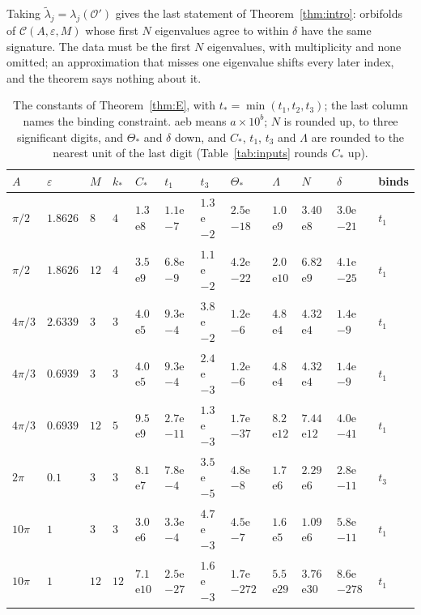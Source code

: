\documentclass[pdflatex,sn-mathphys-num]{sn-jnl}
\theoremstyle{thmstyleone}%
\theoremstyle{thmstylethree}%
\newcommand{\Orb}{\mathcal{O}}
\newcommand{\Cl}{\mathcal{C}}
\begin{document}
Taking $\tilde\lambda_j=\lambda_j(\Orb')$ gives the last statement of Theorem~\ref{thm:intro}: orbifolds of $\Cl(A,\varepsilon,M)$ whose first $N$ eigenvalues agree to within $\delta$ have the same signature. The data must be the first $N$ eigenvalues, with multiplicity and none omitted; an approximation that misses one eigenvalue shifts every later index, and the theorem says nothing about it.

\begin{table}[t]
\centering\footnotesize
\caption{The constants of Theorem~\ref{thm:E}, with $t_*=\min(t_1,t_2,t_3)$; the last column names the binding constraint. aeb means $a\times10^b$; $N$ is rounded up, to three significant digits, and $\Theta_*$ and $\delta$ down, and $C_*$, $t_1$, $t_3$ and $\Lambda$ are rounded to the nearest unit of the last digit (Table~\ref{tab:inputs} rounds $C_*$ up).}\label{tab:E}
\setlength{\tabcolsep}{3pt}\begin{tabular}{@{}llllllllllll@{}}
\toprule
$A$ & $\varepsilon$ & $M$ & $k_*$ & $C_*$ & $t_1$ & $t_3$ & $\Theta_*$ & $\Lambda$ & $N$ & $\delta$ & binds\\
\midrule
$\pi/2$ & $1.8626$ & $8$ & $4$ & $1.3$e$8$ & $1.1$e$-7$ & $1.3$e$-2$ & $2.5$e$-18$ & $1.0$e$9$ & $3.40$e$8$ & $3.0$e$-21$ & $t_1$\\
$\pi/2$ & $1.8626$ & $12$ & $4$ & $3.5$e$9$ & $6.8$e$-9$ & $1.1$e$-2$ & $4.2$e$-22$ & $2.0$e$10$ & $6.82$e$9$ & $4.1$e$-25$ & $t_1$\\
$4\pi/3$ & $2.6339$ & $3$ & $3$ & $4.0$e$5$ & $9.3$e$-4$ & $3.8$e$-2$ & $1.2$e$-6$ & $4.8$e$4$ & $4.32$e$4$ & $1.4$e$-9$ & $t_1$\\
$4\pi/3$ & $0.6939$ & $3$ & $3$ & $4.0$e$5$ & $9.3$e$-4$ & $2.4$e$-3$ & $1.2$e$-6$ & $4.8$e$4$ & $4.32$e$4$ & $1.4$e$-9$ & $t_1$\\
$4\pi/3$ & $0.6939$ & $12$ & $5$ & $9.5$e$9$ & $2.7$e$-11$ & $1.3$e$-3$ & $1.7$e$-37$ & $8.2$e$12$ & $7.44$e$12$ & $4.0$e$-41$ & $t_1$\\
$2\pi$ & $0.1$ & $3$ & $3$ & $8.1$e$7$ & $7.8$e$-4$ & $3.5$e$-5$ & $4.8$e$-8$ & $1.7$e$6$ & $2.29$e$6$ & $2.8$e$-11$ & $t_3$\\
$10\pi$ & $1$ & $3$ & $3$ & $3.0$e$6$ & $3.3$e$-4$ & $4.7$e$-3$ & $4.5$e$-7$ & $1.6$e$5$ & $1.09$e$6$ & $5.8$e$-11$ & $t_1$\\
$10\pi$ & $1$ & $12$ & $12$ & $7.1$e$10$ & $2.5$e$-27$ & $1.6$e$-3$ & $1.7$e$-272$ & $5.5$e$29$ & $3.76$e$30$ & $8.6$e$-278$ & $t_1$\\
\bottomrule
\end{tabular}
\end{table}
\end{document}
